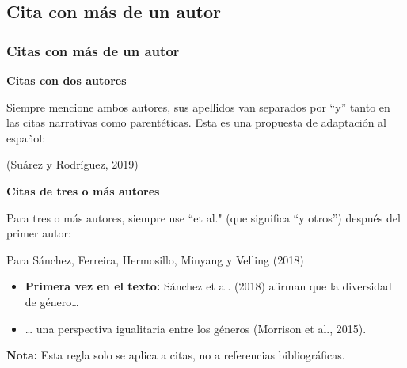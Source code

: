 \documentclass[
11pt, %
]{beamer}
\begin{document}
\subsection{Cita con más de un autor}

\begin{frame}
	\frametitle{Citas con más de un autor}

	\textbf{Citas con dos autores}

	Siempre mencione ambos autores, sus apellidos van separados por “y” tanto en las citas narrativas como parentéticas. Esta es una propuesta de adaptación al español:

	\begin{exampleblock}{}
		(Suárez y Rodríguez, 2019)
	\end{exampleblock}

	\textbf{Citas de tres o más autores}

	Para tres o más autores, siempre use ``et al." (que significa “y otros”) después del primer autor:

	\begin{exampleblock}{Para Sánchez, Ferreira, Hermosillo, Minyang y Velling (2018)}
		\begin{itemize}
			\item \textbf{Primera vez en el texto:} Sánchez {\color{blue}et al.} (2018) afirman que la diversidad de género…
			\item … una perspectiva igualitaria entre los géneros (Morrison et al., 2015).
		\end{itemize}
	\end{exampleblock}

	\textbf{Nota:} Esta regla solo se aplica a citas, no a referencias bibliográficas.

\end{frame}
\end{document}
